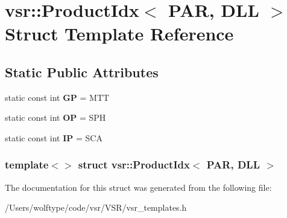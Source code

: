 \hypertarget{structvsr_1_1_product_idx_3_01_p_a_r_00_01_d_l_l_01_4}{\section{vsr\-:\-:Product\-Idx$<$ P\-A\-R, D\-L\-L $>$ Struct Template Reference}
\label{structvsr_1_1_product_idx_3_01_p_a_r_00_01_d_l_l_01_4}
}
\subsection*{Static Public Attributes}
\begin{DoxyCompactItemize}
\item 
\hypertarget{structvsr_1_1_product_idx_3_01_p_a_r_00_01_d_l_l_01_4_a204f77c0b9b90fc8e65021f96aa550a6}{static const int {\bfseries G\-P} = M\-T\-T}\label{structvsr_1_1_product_idx_3_01_p_a_r_00_01_d_l_l_01_4_a204f77c0b9b90fc8e65021f96aa550a6}

\item 
\hypertarget{structvsr_1_1_product_idx_3_01_p_a_r_00_01_d_l_l_01_4_a1d7d9ab8493b7cbc655c8d009a3a82d5}{static const int {\bfseries O\-P} = S\-P\-H}\label{structvsr_1_1_product_idx_3_01_p_a_r_00_01_d_l_l_01_4_a1d7d9ab8493b7cbc655c8d009a3a82d5}

\item 
\hypertarget{structvsr_1_1_product_idx_3_01_p_a_r_00_01_d_l_l_01_4_a20b1a9a7f1f8511fbd1a1220edad9b3b}{static const int {\bfseries I\-P} = S\-C\-A}\label{structvsr_1_1_product_idx_3_01_p_a_r_00_01_d_l_l_01_4_a20b1a9a7f1f8511fbd1a1220edad9b3b}

\end{DoxyCompactItemize}
\subsubsection*{template$<$$>$ struct vsr\-::\-Product\-Idx$<$ P\-A\-R, D\-L\-L $>$}



The documentation for this struct was generated from the following file\-:\begin{DoxyCompactItemize}
\item 
/\-Users/wolftype/code/vsr/\-V\-S\-R/vsr\-\_\-templates.\-h\end{DoxyCompactItemize}
